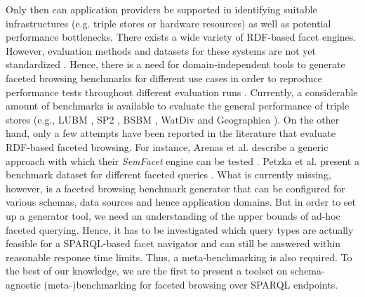 Only then can application providers be supported in identifying suitable infrastructures (e.g. triple stores or hardware resources) as well as potential performance bottlenecks. There exists a wide variety of RDF-based facet engines. However, evaluation methods and datasets for these systems are not yet standardized \cite{tzitzikas}. Hence, there is a need for domain-independent tools to generate faceted browsing benchmarks for different use cases in order to reproduce performance tests throughout different evaluation runs \cite{moreno-vega}. Currently, a considerable amount of benchmarks is available to evaluate the general performance of triple stores (e.g., LUBM \cite{guo}, SP2 \cite{schmidt}, BSBM \cite{bizer}, WatDiv \cite{aluc} and Geographica \cite{garbis}). On the other hand, only a few attempts have been reported in the literature that evaluate RDF-based faceted browsing. For instance, Arenas et al. describe a generic approach with which their \textit{SemFacet} engine can be tested \cite{arenas}. Petzka et al. present a benchmark dataset for different faceted queries \cite{petzka}. What is currently missing, however, is a faceted browsing benchmark generator that can be configured for various schemas, data sources and hence application domains. But in order to set up a generator tool, we need an understanding of the upper bounds of ad-hoc faceted querying. Hence, it has to be investigated which query types are actually feasible for a SPARQL-based facet navigator and can still be answered within reasonable response time limits. Thus, a  meta-benchmarking is also required. To the best of our knowledge, we are the first to present a toolset on schema-agnostic (meta-)benchmarking for faceted browsing over SPARQL endpoints. 




